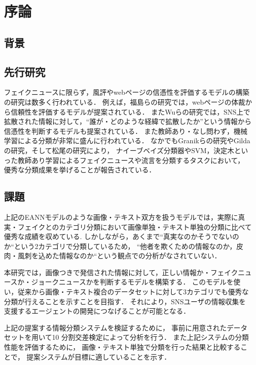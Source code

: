 \chapter{序論}
%
\section{背景}


\section{先行研究}
フェイクニュースに限らず，風評やwebページの信憑性を評価するモデルの構築の研究は数多く行われている．
例えば，福島らの研究\cite{fuk}では，webページの体裁から信頼性を評価するモデルが提案されている．
またWuらの研究\cite{wu}では，SNS上で拡散された情報に対して，``誰が・どのような経緯で拡散したか''という情報から信憑性を判断するモデルも提案されている． 
また教師あり・なし問わず，機械学習による分類が非常に盛んに行われている．
なかでもGranikらの研究\cite{gra}やGildaの研究\cite{gil}，そして松尾の研究\cite{mat}により，
ナイーブベイズ分類器やSVM，決定木といった教師あり学習によるフェイクニュースや流言を分類するタスクにおいて，
優秀な分類成果を挙げることが報告されている．


\section{課題}
上記のEANNモデルのような画像・テキスト双方を扱うモデルでは，実際に真実・フェイクとのカテゴリ分類において画像単独・テキスト単独の分類に比べて優秀な成績を収めている\cite{eann}.
しかしながら，あくまで``真実なのかそうでないのか``という2カテゴリで分類しているため，
``他者を欺くための情報なのか，皮肉・風刺を込めた情報なのか``という観点での分析がなされていない．

本研究では，画像つきで発信された情報に対して，正しい情報か・フェイクニュースか・ジョークニュースかを判断するモデルを構築する．
このモデルを使い，従来から画像・テキスト複合のデータセットに対して3カテゴリでも優秀な分類が行えることを示すことを目指す．
それにより，SNSユーザの情報収集を支援するエージェントの開発につなげることが可能となる．

上記の提案する情報分類システムを検証するために，
事前に用意されたデータセットを用いて10 分割交差検定によって分析を行う．
また上記システムの分類性能を評価するために，
画像・テキスト単独で分類を行った結果と比較することで，
提案システムが目標に適していることを示す．

% 
